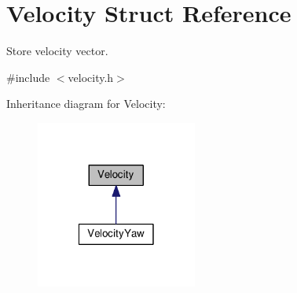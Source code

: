 \hypertarget{structVelocity}{\section{Velocity Struct Reference}
\label{structVelocity}
}


Store velocity vector.  




{\ttfamily \#include $<$velocity.\-h$>$}



Inheritance diagram for Velocity\-:\nopagebreak
\begin{figure}[H]
\begin{center}
\leavevmode
\includegraphics[width=150pt]{structVelocity__inherit__graph}
\end{center}
\end{figure}
